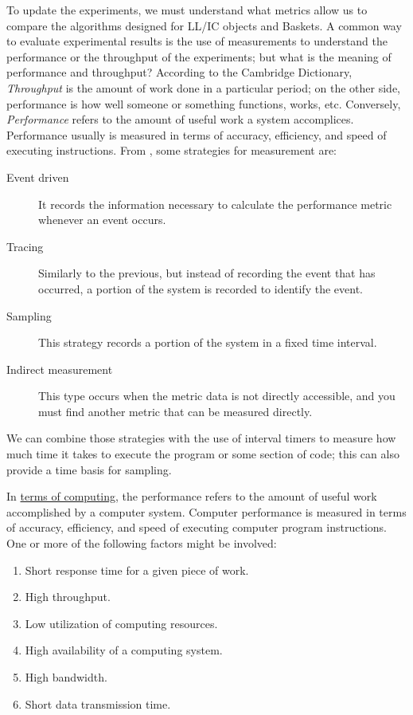 To update the experiments, we must understand what metrics 
allow us to compare the algorithms designed for LL/IC objects and Baskets. A
common way to evaluate experimental results is the use of measurements to
understand the performance or the throughput of the experiments;
but what is the meaning of performance and throughput? According to the
Cambridge Dictionary, \emph{Throughput} is the amount of work done in a particular
period; on the other side, performance is how well someone or something
functions, works, etc. Conversely, \emph{Performance} refers to the amount
of useful work a system accomplices. Performance usually is measured in
terms of accuracy, efficiency, and speed of executing instructions. From
\cite{lilja2005measuring}, some strategies for measurement are:

\begin{description}
\item[{Event driven}] It records the information necessary to calculate the
performance metric whenever an event occurs.
\item[{Tracing}] Similarly to the previous, but instead of recording the event
that has occurred, a portion of the system is recorded to identify the event.
\item[{Sampling}] This strategy records a portion of the system in a fixed time
interval.
\item[{Indirect measurement}] This type occurs when the metric data is not
directly accessible, and you must find another metric that can be measured
directly.
\end{description}

We can combine those strategies with the use of interval timers to measure
how much time it takes to execute the program or some section of code; this can
also provide a time basis for sampling.

In \href{https://en.wikipedia.org/wiki/Computer\_performance}{terms of computing}, the performance refers to the amount of useful
work accomplished by a computer system. Computer performance is measured in
terms of accuracy, efficiency, and speed of executing computer program
instructions. One or more of the following factors might be involved:

\begin{enumerate}
\item Short response time for a given piece of work.
\item High throughput.
\item Low utilization of computing resources.
\item High availability of a computing system.
\item High bandwidth.
\item Short data transmission time.
\end{enumerate}

